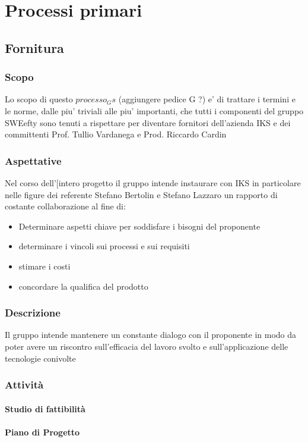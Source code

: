 \section{Processi primari}

\subsection{Fornitura}
	
	\subsubsection{Scopo}
		Lo scopo di questo $processo_Gs$ (aggiungere pedice  G ?) e' di trattare i termini e le norme, dalle piu' triviali alle piu' importanti, che tutti i componenti del gruppo SWEefty sono tenuti a rispettare per diventare fornitori dell'azienda IKS e dei committenti Prof. Tullio Vardanega e Prod. Riccardo Cardin
	\subsubsection{Aspettative}
	Nel corso dell'[intero progetto il gruppo intende instaurare con IKS in particolare nelle figure dei referente Stefano Bertolin e Stefano Lazzaro un rapporto di costante collaborazione al fine di:
	\begin{itemize}
	\item Determinare aspetti chiave per soddisfare i bisogni del proponente
	\item determinare i vincoli sui processi e sui requisiti
	\item stimare i costi 
	\item concordare la qualifica del prodotto
	\end{itemize}
	\subsubsection{Descrizione}
	Il gruppo intende mantenere un constante dialogo con il proponente in modo da poter avere un riscontro sull'efficacia del lavoro svolto e sull'applicazione delle tecnologie conivolte
	\subsubsection{Attività}
		\paragraph{Studio di fattibilità}
		\paragraph{Piano di Progetto}
